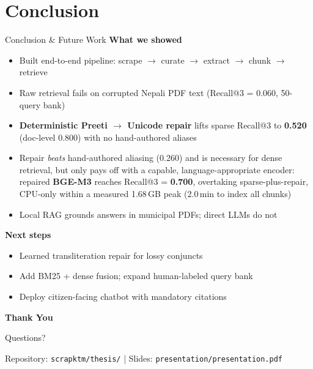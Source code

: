 \documentclass[11pt,aspectratio=169]{beamer}
\begin{document}
\section{Conclusion}
\begin{frame}{Conclusion \& Future Work}
  \textbf{What we showed}
  \begin{itemize}
    \item Built end-to-end pipeline: scrape $\rightarrow$ curate $\rightarrow$ extract $\rightarrow$ chunk $\rightarrow$ retrieve
    \item Raw retrieval fails on corrupted Nepali PDF text (Recall@3 = 0.060, 50-query bank)
    \item \textbf{Deterministic Preeti $\rightarrow$ Unicode repair} lifts sparse Recall@3 to \textbf{0.520} (doc-level 0.800) with no hand-authored aliases
    \item Repair \emph{beats} hand-authored aliasing (0.260) and is necessary for dense retrieval, but only pays off with a capable, language-appropriate encoder: repaired \textbf{BGE-M3} reaches Recall@3 = \textbf{0.700}, overtaking sparse-plus-repair, CPU-only within a measured 1.68\,GB peak (2.0\,min to index all chunks)
    \item Local RAG grounds answers in municipal PDFs; direct LLMs do not
  \end{itemize}
  \textbf{Next steps}
  \begin{itemize}
    \item Learned transliteration repair for lossy conjuncts
    \item Add BM25 + dense fusion; expand human-labeled query bank
    \item Deploy citizen-facing chatbot with mandatory citations
  \end{itemize}
\end{frame}

\begin{frame}
  \centering
  \Large\textbf{Thank You}
  \vspace{0.6cm}

  \normalsize Questions?

  \vspace{0.5cm}
  \small
  Repository: \texttt{scrapktm/thesis/} \quad|\quad
  Slides: \texttt{presentation/presentation.pdf}
\end{frame}
\end{document}

